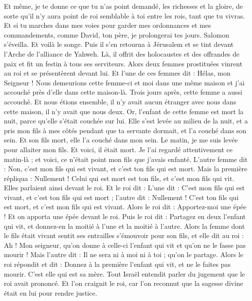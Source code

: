 \begin{multicols}{2}
Et même, je te donne ce que tu n'as point demandé, les richesses et la gloire, de sorte qu'il n'y aura point de roi semblable à toi entre les rois, tant que tu vivras.
Et si tu marches dans mes voies pour garder mes ordonnances et mes commandements, comme David, ton père, je prolongerai tes jours.
Salomon s’éveilla. Et voilà le songe. Puis il s'en retourna à Jérusalem et se tint devant l'Arche de l'alliance de Yahweh. Là, il offrit des holocaustes et des offrandes de paix et fit un festin à tous ses serviteurs.
Alors deux femmes prostituées vinrent au roi et se présentèrent devant lui.
Et l'une de ces femmes dit : Hélas, mon Seigneur ! Nous demeurions cette femme-ci et moi dans une même maison et j'ai accouché près d’elle dans cette maison-là.
Trois jours après, cette femme a aussi accouché. Et nous étions ensemble, il n'y avait aucun étranger avec nous dans cette maison, il n’y avait que nous deux.
Or, l'enfant de cette femme est mort la nuit, parce qu'elle s'était couchée sur lui.
Elle s'est levée au milieu de la nuit, et a pris mon fils à mes côtés pendant que ta servante dormait, et l'a couché dans son sein. Et son fils mort, elle l’a couché dans mon sein.
Le matin, je me suis levée pour allaiter mon fils. Et voici, il était mort. Je l’ai regardé attentivement ce matin-là ; et voici, ce n'était point mon fils que j'avais enfanté.
L’autre femme dit : Non, c’est mon fils qui est vivant, et c’est ton fils qui est mort. Mais la première répliqua : Nullement ! Celui qui est mort est ton fils, et c’est mon fils qui vit. Elles parlaient ainsi devant le roi.
Et le roi dit : L’une dit : C’est mon fils qui est vivant, et c’est ton fils qui est mort ; l’autre dit : Nullement ! C’est ton fils qui est mort, et c’est mon fils qui est vivant.
Alors le roi dit : Apportez-moi une épée ! Et on apporta une épée devant le roi.
Puis le roi dit : Partagez en deux l'enfant qui vit, et donnez-en la moitié à l'une et la moitié à l'autre.
Alors la femme dont le fils était vivant sentit ses entrailles s’émouvoir pour son fils, et elle dit au roi : Ah ! Mon seigneur, qu'on donne à celle-ci l'enfant qui vit et qu'on ne le fasse pas mourir ! Mais l'autre dit : Il ne sera ni à moi ni à toi ; qu'on le partage.
Alors le roi répondit et dit : Donnez à la première l'enfant qui vit, et ne le faites pas mourir. C’est elle qui est sa mère.
Tout Israël entendit parler du jugement que le roi avait prononcé. Et l’on craignit le roi, car l’on reconnut que la sagesse divine était en lui pour rendre justice.

\end{multicols}
